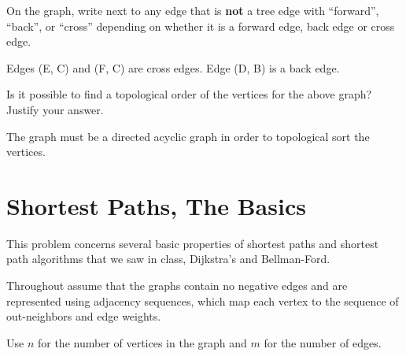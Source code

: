 \begin{problem}
\begin{minipage}{.45\textwidth}
\begin{center}
\begin{tabular}{c|c|c}
    \end{tabular}
  \end{center}
\end{minipage}


\ask[8] On the graph, write next to any edge that is  \textbf{not} a tree edge with
``forward'', ``back'', or ``cross'' depending on whether it is a
forward edge, back edge or cross edge.


\sol
Edges (E, C) and (F, C) are cross edges. Edge (D, B) is a back edge.



\asktf[4] Is it possible to find a topological order of the vertices
for the above graph? Justify your answer.

\solf

\sol
The graph must be a directed acyclic graph in order to
topological sort the vertices.

\end{problem}



\section{Shortest Paths, The Basics}

This problem concerns several basic properties of shortest paths and
shortest path algorithms that we saw in class, Dijkstra's and
Bellman-Ford.

Throughout assume that the graphs contain no negative edges and are
represented using adjacency sequences,  which map each
vertex to the sequence of out-neighbors and edge weights.

Use $n$ for the number of vertices in the graph and $m$ for the number
of edges.

